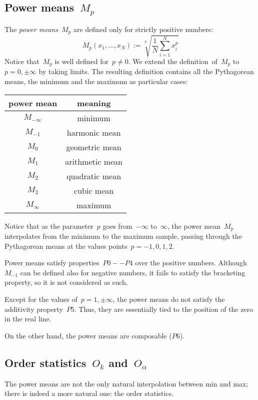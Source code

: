\documentclass[a4paper]{article}
\begin{document}
\subsection{Power means~$M_p$}

The \emph{power means}~$M_p$ are defined only for strictly positive numbers:
\[
	M_p(x_1,\ldots,x_N):=\sqrt[p]{\frac{1}{N}\sum_{i=1}^Nx_i^p}
\]
Notice that~$M_p$ is well defined for~$p\neq0$.  We extend the
definition~of~$M_p$ to~$p=0,\pm\infty$ by taking limits.  The
resulting definition contains all the Pythagorean means, the minimum and
the maximum as particular cases:

\medskip

\begin{tabular}{c|c}
	power mean & meaning \\
	\hline
	$M_{-\infty}$ & minimum \\
	$M_{-1}$ & harmonic mean \\
	$M_0$ & geometric mean \\
	$M_1$ & arithmetic mean \\
	$M_2$ & quadratic mean \\
	$M_3$ & cubic mean \\
	$M_\infty$ & maximum \\
\end{tabular}

\medskip

Notice that as the parameter~$p$ goes from~$-\infty$ to~$\infty$, the
power mean~$M_p$ interpolates from the minimum to the maximum sample,
passing through the Pythagorean means at the values
points~$p=-1,0,1,2$.

Power means satisfy properties~$P0--P4$ over the positive numbers.
Although~$M_{-1}$ can be defined also for negative numbers, it fails
to satisfy the bracketing property, so it is not considered as such.

Except for the values of~$p=1,\pm\infty$, the power means do not
satisfy the additivity property~$P5$.  Thus, they are essentially
tied to the position of the zero in the real line.

On the other hand, the power means are composable ($P6$).

\subsection{Order statistics~$O_k$ and~$O_{\alpha}$}

The power means are not the only natural interpolation between min
and max; there is indeed a more natural one: the order statistics.
\end{document}
